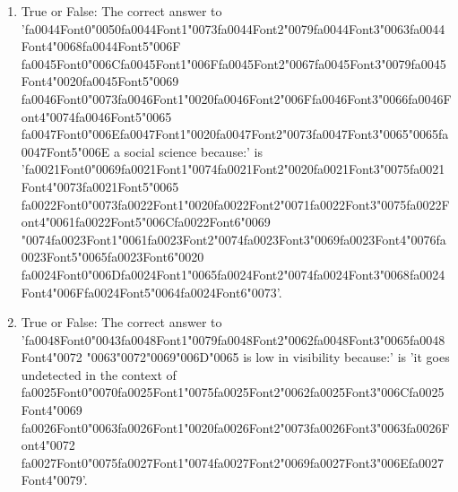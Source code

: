 \documentclass[12pt]{article}
\begin{document}
\begin{enumerate}[label=\arabic*.]
\item True or False: The correct answer to '{\csname fa0044Font0\endcsname\char"0050}{\csname fa0044Font1\endcsname\char"0073}{\csname fa0044Font2\endcsname\char"0079}{\csname fa0044Font3\endcsname\char"0063}{\csname fa0044Font4\endcsname\char"0068}{\csname fa0044Font5\endcsname\char"006F} {\csname fa0045Font0\endcsname\char"006C}{\csname fa0045Font1\endcsname\char"006F}{\csname fa0045Font2\endcsname\char"0067}{\csname fa0045Font3\endcsname\char"0079}{\csname fa0045Font4\endcsname\char"0020}{\csname fa0045Font5\endcsname\char"0069} {\csname fa0046Font0\endcsname\char"0073}{\csname fa0046Font1\endcsname\char"0020}{\csname fa0046Font2\endcsname\char"006F}{\csname fa0046Font3\endcsname\char"0066}{\csname fa0046Font4\endcsname\char"0074}{\csname fa0046Font5\endcsname\char"0065} {\csname fa0047Font0\endcsname\char"006E}{\csname fa0047Font1\endcsname\char"0020}{\csname fa0047Font2\endcsname\char"0073}{\csname fa0047Font3\endcsname\char"0065}{\char"0065}{\csname fa0047Font5\endcsname\char"006E} a social science because:' is '{\csname fa0021Font0\endcsname\char"0069}{\csname fa0021Font1\endcsname\char"0074}{\csname fa0021Font2\endcsname\char"0020}{\csname fa0021Font3\endcsname\char"0075}{\csname fa0021Font4\endcsname\char"0073}{\csname fa0021Font5\endcsname\char"0065} {\csname fa0022Font0\endcsname\char"0073}{\csname fa0022Font1\endcsname\char"0020}{\csname fa0022Font2\endcsname\char"0071}{\csname fa0022Font3\endcsname\char"0075}{\csname fa0022Font4\endcsname\char"0061}{\csname fa0022Font5\endcsname\char"006C}{\csname fa0022Font6\endcsname\char"0069} {\char"0074}{\csname fa0023Font1\endcsname\char"0061}{\csname fa0023Font2\endcsname\char"0074}{\csname fa0023Font3\endcsname\char"0069}{\csname fa0023Font4\endcsname\char"0076}{\csname fa0023Font5\endcsname\char"0065}{\csname fa0023Font6\endcsname\char"0020} {\csname fa0024Font0\endcsname\char"006D}{\csname fa0024Font1\endcsname\char"0065}{\csname fa0024Font2\endcsname\char"0074}{\csname fa0024Font3\endcsname\char"0068}{\csname fa0024Font4\endcsname\char"006F}{\csname fa0024Font5\endcsname\char"0064}{\csname fa0024Font6\endcsname\char"0073}'.
\item True or False: The correct answer to '{\csname fa0048Font0\endcsname\char"0043}{\csname fa0048Font1\endcsname\char"0079}{\csname fa0048Font2\endcsname\char"0062}{\csname fa0048Font3\endcsname\char"0065}{\csname fa0048Font4\endcsname\char"0072} {\char"0063}{\char"0072}{\char"0069}{\char"006D}{\char"0065} is low in visibility because:' is 'it goes undetected in the context of {\csname fa0025Font0\endcsname\char"0070}{\csname fa0025Font1\endcsname\char"0075}{\csname fa0025Font2\endcsname\char"0062}{\csname fa0025Font3\endcsname\char"006C}{\csname fa0025Font4\endcsname\char"0069} {\csname fa0026Font0\endcsname\char"0063}{\csname fa0026Font1\endcsname\char"0020}{\csname fa0026Font2\endcsname\char"0073}{\csname fa0026Font3\endcsname\char"0063}{\csname fa0026Font4\endcsname\char"0072} {\csname fa0027Font0\endcsname\char"0075}{\csname fa0027Font1\endcsname\char"0074}{\csname fa0027Font2\endcsname\char"0069}{\csname fa0027Font3\endcsname\char"006E}{\csname fa0027Font4\endcsname\char"0079}'.

\end{enumerate}
\end{document}
